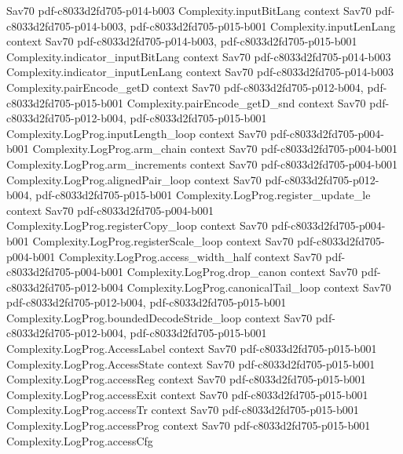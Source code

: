 \begin{theorem}
  {Sav70}
  {pdf-c8033d2fd705-p014-b003}
\proofstep
  {Complexity.inputBitLang}
  {context}
  {Sav70}
  {pdf-c8033d2fd705-p014-b003,
    pdf-c8033d2fd705-p015-b001}
\proofstep
  {Complexity.inputLenLang}
  {context}
  {Sav70}
  {pdf-c8033d2fd705-p014-b003,
    pdf-c8033d2fd705-p015-b001}
\proofstep
  {Complexity.indicator_inputBitLang}
  {context}
  {Sav70}
  {pdf-c8033d2fd705-p014-b003}
\proofstep
  {Complexity.indicator_inputLenLang}
  {context}
  {Sav70}
  {pdf-c8033d2fd705-p014-b003}
\proofstep
  {Complexity.pairEncode_getD}
  {context}
  {Sav70}
  {pdf-c8033d2fd705-p012-b004,
    pdf-c8033d2fd705-p015-b001}
\proofstep
  {Complexity.pairEncode_getD_snd}
  {context}
  {Sav70}
  {pdf-c8033d2fd705-p012-b004,
    pdf-c8033d2fd705-p015-b001}
\proofstep
  {Complexity.LogProg.inputLength_loop}
  {context}
  {Sav70}
  {pdf-c8033d2fd705-p004-b001}
\proofstep
  {Complexity.LogProg.arm_chain}
  {context}
  {Sav70}
  {pdf-c8033d2fd705-p004-b001}
\proofstep
  {Complexity.LogProg.arm_increments}
  {context}
  {Sav70}
  {pdf-c8033d2fd705-p004-b001}
\proofstep
  {Complexity.LogProg.alignedPair_loop}
  {context}
  {Sav70}
  {pdf-c8033d2fd705-p012-b004,
    pdf-c8033d2fd705-p015-b001}
\proofstep
  {Complexity.LogProg.register_update_le}
  {context}
  {Sav70}
  {pdf-c8033d2fd705-p004-b001}
\proofstep
  {Complexity.LogProg.registerCopy_loop}
  {context}
  {Sav70}
  {pdf-c8033d2fd705-p004-b001}
\proofstep
  {Complexity.LogProg.registerScale_loop}
  {context}
  {Sav70}
  {pdf-c8033d2fd705-p004-b001}
\proofstep
  {Complexity.LogProg.access_width_half}
  {context}
  {Sav70}
  {pdf-c8033d2fd705-p004-b001}
\proofstep
  {Complexity.LogProg.drop_canon}
  {context}
  {Sav70}
  {pdf-c8033d2fd705-p012-b004}
\proofstep
  {Complexity.LogProg.canonicalTail_loop}
  {context}
  {Sav70}
  {pdf-c8033d2fd705-p012-b004,
    pdf-c8033d2fd705-p015-b001}
\proofstep
  {Complexity.LogProg.boundedDecodeStride_loop}
  {context}
  {Sav70}
  {pdf-c8033d2fd705-p012-b004,
    pdf-c8033d2fd705-p015-b001}
\proofstep
  {Complexity.LogProg.AccessLabel}
  {context}
  {Sav70}
  {pdf-c8033d2fd705-p015-b001}
\proofstep
  {Complexity.LogProg.AccessState}
  {context}
  {Sav70}
  {pdf-c8033d2fd705-p015-b001}
\proofstep
  {Complexity.LogProg.accessReg}
  {context}
  {Sav70}
  {pdf-c8033d2fd705-p015-b001}
\proofstep
  {Complexity.LogProg.accessExit}
  {context}
  {Sav70}
  {pdf-c8033d2fd705-p015-b001}
\proofstep
  {Complexity.LogProg.accessTr}
  {context}
  {Sav70}
  {pdf-c8033d2fd705-p015-b001}
\proofstep
  {Complexity.LogProg.accessProg}
  {context}
  {Sav70}
  {pdf-c8033d2fd705-p015-b001}
\proofstep
  {Complexity.LogProg.accessCfg}

\end{theorem}
